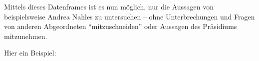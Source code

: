 \documentclass[oneside, 12pt, numbers=endperiod]{scrbook}
\newenvironment{Shaded}{\begin{snugshade}}{\end{snugshade}}
\newcommand{\DataTypeTok}[1]{\textcolor[rgb]{0.13,0.29,0.53}{#1}}
\newcommand{\KeywordTok}[1]{\textcolor[rgb]{0.13,0.29,0.53}{\textbf{#1}}}
\newcommand{\NormalTok}[1]{#1}
\newcommand{\OperatorTok}[1]{\textcolor[rgb]{0.81,0.36,0.00}{\textbf{#1}}}
\newcommand{\OtherTok}[1]{\textcolor[rgb]{0.56,0.35,0.01}{#1}}
\newcommand{\StringTok}[1]{\textcolor[rgb]{0.31,0.60,0.02}{#1}}
\theoremstyle{definition}
\theoremstyle{definition}
\theoremstyle{definition}
\theoremstyle{remark}
\begin{document}
Mittels dieses Datenframes ist es nun möglich, nur die Aussagen von
beispielsweise Andrea Nahles zu untersuchen -- ohne Unterbrechungen und
Fragen von anderen Abgeordneten ``mitzuschneiden'' oder Aussagen des
Präsidiums mitzunehmen.

Hier ein Beispiel:

\begin{Shaded}
\end{Shaded}
\end{document}

